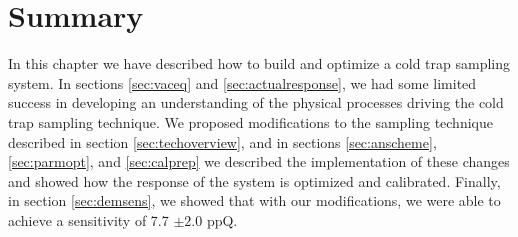 \clearpage
\section{Summary}
In this chapter we have described how to build and optimize a cold trap sampling system. In sections \ref{sec:vaceq} and \ref{sec:actualresponse}, we had some limited success in developing an understanding of the physical processes driving the cold trap sampling technique. We proposed modifications to the sampling technique described in section \ref{sec:techoverview}, and in sections \ref{sec:anscheme}, \ref{sec:parmopt}, and \ref{sec:calprep} we described the implementation of these changes and showed how the response of the system is optimized and calibrated. Finally, in section \ref{sec:demsens}, we showed that with our modifications, we were able to achieve a sensitivity of 7.7 $\pm2.0$ ppQ.

